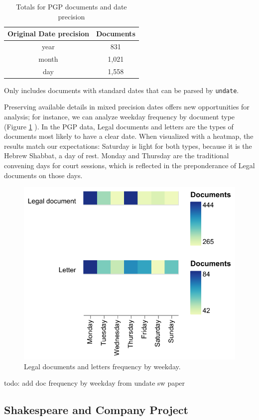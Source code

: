 \documentclass{anthology-ch}         %
\begin{document}
\begin{table}[h]
  \centering 
  \begin{tabular}{cc}
    \toprule
    Original Date precision & Documents \\ 
    \midrule
    year & 831 \\
    month & 1,021 \\
    day & 1,558 \\
    \bottomrule
  \end{tabular}
  \caption{Totals for PGP documents and date precision}
    \medskip
    \small
    Only includes documents with standard dates that can be parsed by \texttt{undate}.
  \label{tab:example}
\end{table}

Preserving available details in mixed precision dates offers new opportunities for analysis; for instance, we can analyze weekday frequency by document type (Figure \ref{fig:pgp-weekday-frequency} ). In the PGP data, Legal documents and letters are the types of documents most likely to have a clear date. When visualized with a heatmap, the results match our expectations: Saturday is light for both types, because it is the Hebrew Shabbat, a day of rest. Monday and Thursday are the traditional convening days for court sessions, which is reflected in the preponderance of Legal documents on those days.

\begin{figure}[t!]
  \centering
  \includegraphics[width=0.4\linewidth]{assets/pgp_letters_legaldocs_weekday.pdf}
  \caption{Legal documents and letters frequency by weekday.}
  \label{fig:pgp-weekday-frequency}
\end{figure}

todo: add doc frequency by weekday from undate sw paper


\subsection{Shakespeare and Company
Project}\label{shakespeare-and-company-project}
\end{document}
